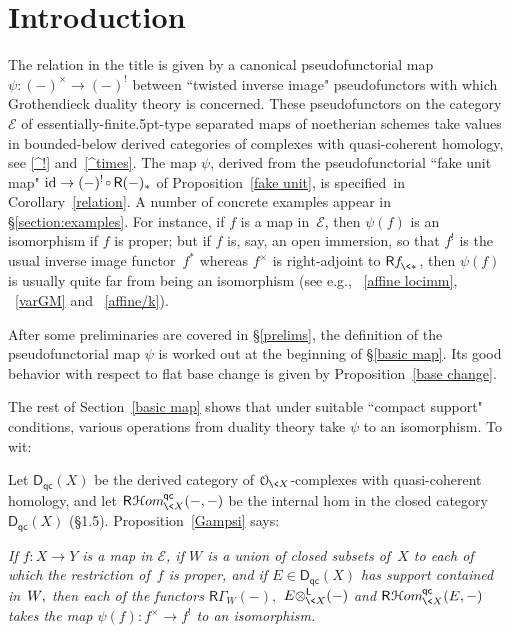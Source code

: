 \documentclass{compositio}
\theoremstyle{plain}
\theoremstyle{definition}
\theoremstyle{remark}
\numberwithin{equation}{thm}
\begin{document}
\section*{Introduction}
The relation in the title is given by a canonical pseudofunctorial map $\psi\colon(-)^\times\to (-)^!$ between ``twisted inverse image" pseudofunctors with which Grothendieck duality theory is concerned. These pseudofunctors on the category ${\mathscr{E}}$ of  essentially-finite{\kern.5pt}-type separated maps of noetherian schemes take values in bounded-below derived categories  of complexes with 
quasi-coherent homology, see \ref{^!} and~\ref{^times}.{}  The map $\psi$, derived from the pseudofunctorial ``fake unit map" $\operatorname{id}\to(-)^!{{{\mkern1mu}{\mkern1mu}{\vbox to 0pt{\vskip-1 ex\hbox{$\scriptstyle {\scriptstyle}{\circ}$}\vss}}\,}}{\mathsf R}(-)_*$ of Proposition~\ref{fake unit}, is specified\ in Corollary~\ref{relation}.  A number of concrete examples appear in 
\S\ref{section:examples}. For instance, if  $f$ is a map in~${\mathscr{E}}$, then $\psi(f)$ is an isomorphism if $f$ is proper; but if $f$ is, say, an open immersion, so that 
$f^!$ is the usual inverse image functor~$f^*$ whereas $f^\times$ is right-adjoint to 
${\mathsf R}{{f^{}_{{\mkern-1mu}\<*}}}{\mkern1mu}$, then $\psi(f)$ is usually quite far from being an isomorphism (see e.g., ~\ref{affine locimm}, ~\ref{varGM} and ~\ref{affine/k}).

After some preliminaries are covered in \S\ref{prelims}, the definition of the pseudofunctorial map $\psi$ is worked out at the beginning of \S\ref{basic map}.
Its good behavior with respect to flat base change is given by Proposition~\ref{base change}.

The rest of Section~\ref{basic map} shows that under suitable ``compact support" conditions,  various operations from duality theory take $\psi$ to an isomorphism.
To wit:

Let ${{\boldsymbol{\mathsf{D}}}_{\mathsf{qc}}}(X)$ be the derived category of ${\mathcal O_{{\mkern-1mu}\<X}}$-complexes with 
quasi-coherent homology, and let ${{\mathsf R}{\mkern1mu}{{\mathcal H} om}_{{{\mkern-1mu}\<X}}^{{\mkern-1mu}{\mathsf{qc}}}}(-,-)$ be
the internal hom in the closed category ${{\boldsymbol{\mathsf{D}}}_{\mathsf{qc}}}(X)$ (\S1.5).
Proposition~\ref{Gampsi} says: 

\noindent\emph{If\/ $f\colon X\to Y$ is a map in\/ ${\mathscr{E}}$,
if\/ $W$ is a union of closed subsets of\/~$X$  to each of which the restriction 
of\/~$f$ is proper, and if\/ $E\in{{\boldsymbol{\mathsf{D}}}_{\mathsf{qc}}}(X)$ has support contained in\/~$W{\mkern-1mu},$ then each of the  functors\/ ${\mathsf R}{\varGamma}^{}_{\!W}(-),$ $E{\otimes^{\mathsf L}_{{{\mkern-1mu}\<X}}}(-)$ and\/  ${{\mathsf R}{\mkern1mu}{{\mathcal H} om}_{{{\mkern-1mu}\<X}}^{{\mkern-1mu}{\mathsf{qc}}}}(E,-)$  takes the map\/ $\psi(f)\colon f^\times\to f^!$ to an isomorphism.}  
\end{document}
